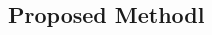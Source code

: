 \documentclass[a0,portrait]{a0poster}
\begin{document}
\begin{multicols}{3}
\section*{Proposed Methodl}



\end{multicols}
 
\end{document}
